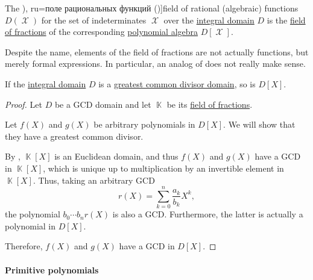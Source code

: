 \begin{definition}\label{def:rational_function_field}
  The \term[bg=поле на рационалните функции (\cite[360]{ГеновМиховскиМоллов1991Алгебра}), ru=поле рациональных функций (\cite[18]{Шафаревич1999Алгебра})]{field of rational (algebraic) functions} \( D(\mscrX) \) for the set of indeterminates \( \mscrX \) over the \hyperref[def:integral_domain]{integral domain} \( D \) is the \hyperref[def:field_of_fractions]{field of fractions} of the corresponding \hyperref[def:polynomial_algebra]{polynomial algebra} \( D[\mscrX] \).
\end{definition}
\begin{comments}
  \item Despite the name, elements of the field of fractions are not actually functions, but merely formal expressions. In particular, an analog of  does not really make sense.
\end{comments}

\begin{proposition}\label{thm:polynomial_ring_over_gcd_domain}
  If the \hyperref[def:integral_domain]{integral domain} \( D \) is a \hyperref[def:gcd_domain]{greatest common divisor domain}, so is \( D[X] \).
\end{proposition}
\begin{proof}
  Let \( D \) be a GCD domain and let \( \BbbK \) be its \hyperref[def:field_of_fractions]{field of fractions}.

  Let \( f(X) \) and \( g(X) \) be arbitrary polynomials in \( D[X] \). We will show that they have a greatest common divisor.

  By , \( \BbbK[X] \) is an Euclidean domain, and thus \( f(X) \) and \( g(X) \) have a GCD in \( \BbbK[X] \), which is unique up to multiplication by an invertible element in \( \BbbK[X] \). Thus, taking an arbitrary GCD
  \begin{equation*}
    r(X) = \sum_{k=0}^n \frac {a_k} {b_k} X^k,
  \end{equation*}
  the polynomial \( b_0 \cdots b_n r(X) \) is also a GCD. Furthermore, the latter is actually a polynomial in \( D[X] \).

  Therefore, \( f(X) \) and \( g(X) \) have a GCD in \( D[X] \).
\end{proof}

\paragraph{Primitive polynomials}

